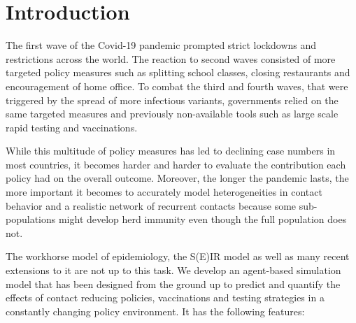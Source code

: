 \section{Introduction}
\label{sec:introduction}

The first wave of the Covid-19 pandemic prompted strict lockdowns and restrictions
across the world. The reaction to second waves consisted of more targeted policy
measures such as splitting school classes, closing restaurants and encouragement of home
office. To combat the third and fourth waves, that were triggered by the spread of more
infectious variants, governments relied on the same targeted measures and previously
non-available tools such as large scale rapid testing and vaccinations.

While this multitude of policy measures has led to declining case numbers in most
countries, it becomes harder and harder to evaluate the contribution each policy had on
the overall outcome. Moreover, the longer the pandemic lasts, the more important it
becomes to accurately model heterogeneities in contact behavior and a realistic network
of recurrent contacts because some sub-populations might develop herd immunity even
though the full population does not.

The workhorse model of epidemiology, the S(E)IR model as well as many recent extensions
to it are not up to this task. We develop an agent-based simulation model that has been
designed from the ground up to predict and quantify the effects of contact reducing
policies, vaccinations and testing strategies in a constantly changing policy
environment. It has the following features:

